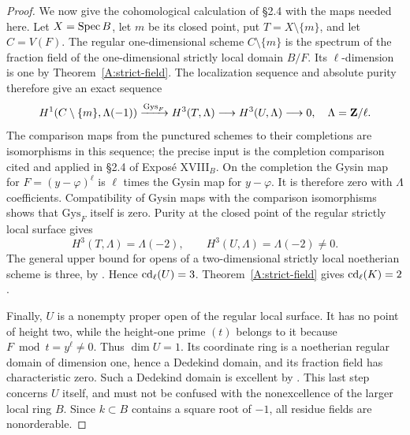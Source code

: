 \begin{proof}
We now give the cohomological calculation of \S2.4 with the maps needed here. Let $X=\operatorname{Spec} B$, let $m$ be its closed point, put $T=X\setminus\{m\}$, and let $C=V(F)$. The regular one-dimensional scheme $C\setminus\{m\}$ is the spectrum of the fraction field of the one-dimensional strictly local domain $B/F$. Its $\ell$-dimension is one by Theorem~\ref{A:strict-field}. The localization sequence and absolute purity therefore give an exact sequence
\[
H^1(C\setminus\{m\},\Lambda(-1))
\xrightarrow{\mathrm{Gys}_F}H^3(T,\Lambda)
\longrightarrow H^3(U,\Lambda)\longrightarrow0,
\quad \Lambda=\mathbf Z/\ell.
\]
The comparison maps from the punctured schemes to their completions are isomorphisms in this sequence; the precise input is the completion comparison cited and applied in \S2.4 of Exposé XVIII$_B$. On the completion the Gysin map for $F=(y-\varphi)^\ell$ is $\ell$ times the Gysin map for $y-\varphi$. It is therefore zero with $\Lambda$ coefficients. Compatibility of Gysin maps with the comparison isomorphisms shows that $\mathrm{Gys}_F$ itself is zero. Purity at the closed point of the regular strictly local surface gives
\[
H^3(T,\Lambda)=\Lambda(-2),
\qquad H^3(U,\Lambda)=\Lambda(-2)\neq0.
\]
The general upper bound for opens of a two-dimensional strictly local noetherian scheme is three, by \citet[Exposé XVIII$_A$, Théorème 1.1]{A_ILO2014}. Hence $\operatorname{cd}_\ell(U)=3$. Theorem~\ref{A:strict-field} gives $\operatorname{cd}_\ell(K)=2$.

Finally, $U$ is a nonempty proper open of the regular local surface. It has no point of height two, while the height-one prime $(t)$ belongs to it because $F\bmod t=y^\ell\neq0$. Thus $\dim U=1$. Its coordinate ring is a noetherian regular domain of dimension one, hence a Dedekind domain, and its fraction field has characteristic zero. Such a Dedekind domain is excellent by \citet[Tag 07QS, Proposition 15.53.3(4)]{A_Stacks}. This last step concerns $U$ itself, and must not be confused with the nonexcellence of the larger local ring $B$. Since $k\subset B$ contains a square root of $-1$, all residue fields are nonorderable.
\end{proof}

